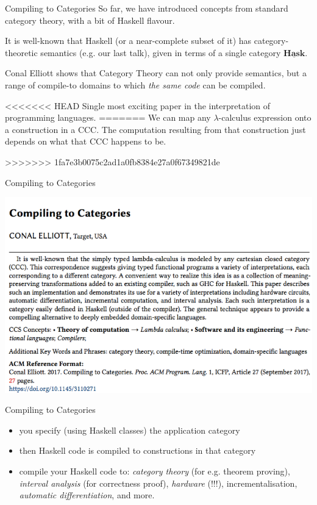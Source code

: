 \documentclass[10pt]{beamer}
\newcommand{\Cat}[1]{\ensuremath{\underline{\mathbf{#1}}}}
\theoremstyle{definition}
\theoremstyle{remark}
\numberwithin{equation}{section}
\begin{document}
\begin{frame}[fragile]{Compiling to Categories}
  So far, we have introduced concepts from standard category theory, with a bit of Haskell flavour.

  It is well-known that Haskell (or a near-complete subset of it) has category-theoretic semantics (e.g. our last talk), given in terms of a single category $\Cat{Hask}$.

  Conal Elliott shows that Category Theory can not only provide semantics, but a range of compile-to domains to which \emph{the same code} can be compiled.

<<<<<<< HEAD
  Single most exciting paper in the interpretation of programming languages.
=======
  We can map any $\lambda$-calculus expression onto a construction in a CCC. The computation resulting from that construction just depends on what that CCC happens to be.
  
>>>>>>> 1fa7e3b0075c2ad1a0fb8384e27a0f67349821de
\end{frame}

\begin{frame}[fragile]{Compiling to Categories}
  \begin{center}
    \includegraphics[width=1.0\textwidth]{compiling-to-categories-headpic.png}
  \end{center}
\end{frame}

\begin{frame}[fragile]{Compiling to Categories}
  \begin{itemize}
    \item you specify (using Haskell classes) the application category
    \item then Haskell code is compiled to constructions in that category
    \item compile your Haskell code to: \emph{category theory} (for e.g. theorem proving), \emph{interval analysis} (for correctness proof), \emph{hardware} (!!!), incrementalisation, \emph{automatic differentiation}, and more.
  \end{itemize}
\end{frame}
\end{document}
